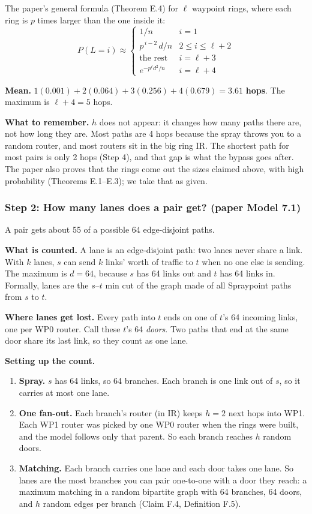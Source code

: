 The paper's general formula (Theorem E.4) for $\ell$ waypoint rings, where each ring is $p$ times larger than the one inside it:
\[
P(L = i) \approx
\begin{cases}
  1/n & i = 1 \\
  p^{\,i-2}\, d/n & 2 \le i \le \ell + 2 \\
  \text{the rest} & i = \ell + 3 \\
  e^{-p^{\ell} d^2 / n} & i = \ell + 4
\end{cases}
\]

\textbf{Mean.} $1(0.001) + 2(0.064) + 3(0.256) + 4(0.679) = \mathbf{3.61}$ \textbf{hops}. The maximum is $\ell + 4 = 5$ hops.

\textbf{What to remember.} $h$ does not appear: it changes how many paths there are, not how long they are. Most paths are 4 hops because the spray throws you to a random router, and most routers sit in the big ring IR. The shortest path for most pairs is only 2 hops (Step 4), and that gap is what the bypass goes after. The paper also proves that the rings come out the sizes claimed above, with high probability (Theorems E.1--E.3); we take that as given.

\subsubsection{Step 2: How many lanes does a pair get? (paper Model 7.1)}

A pair gets about 55 of a possible 64 edge-disjoint paths.

\textbf{What is counted.} A lane is an edge-disjoint path: two lanes never share a link. With $k$ lanes, $s$ can send $k$ links' worth of traffic to $t$ when no one else is sending. The maximum is $d = 64$, because $s$ has 64 links out and $t$ has 64 links in. Formally, lanes are the $s$--$t$ min cut of the graph made of all Spraypoint paths from $s$ to $t$.

\textbf{Where lanes get lost.} Every path into $t$ ends on one of $t$'s 64 incoming links, one per WP0 router. Call these $t$'s 64 \emph{doors}. Two paths that end at the same door share its last link, so they count as one lane.

\textbf{Setting up the count.}
\begin{enumerate}
  \item \textbf{Spray.} $s$ has 64 links, so 64 branches. Each branch is one link out of $s$, so it carries at most one lane.
  \item \textbf{One fan-out.} Each branch's router (in IR) keeps $h = 2$ next hops into WP1. Each WP1 router was picked by one WP0 router when the rings were built, and the model follows only that parent. So each branch reaches $h$ random doors.
  \item \textbf{Matching.} Each branch carries one lane and each door takes one lane. So lanes are the most branches you can pair one-to-one with a door they reach: a maximum matching in a random bipartite graph with 64 branches, 64 doors, and $h$ random edges per branch (Claim F.4, Definition F.5).
\end{enumerate}

